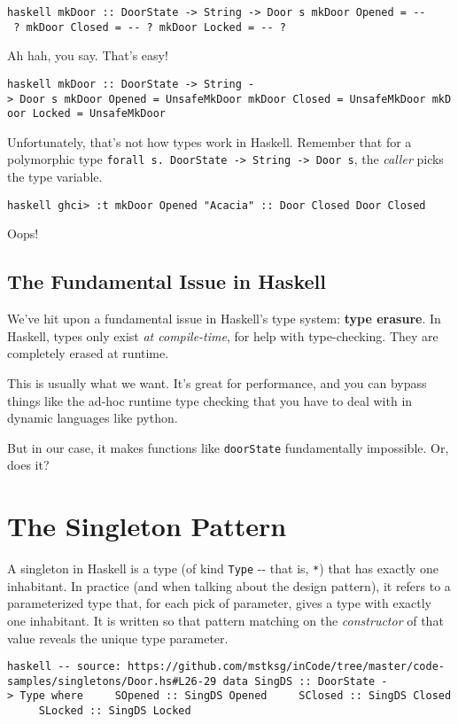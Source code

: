 \documentclass[]{article}
\begin{document}
\texttt{haskell\ mkDoor\ ::\ DoorState\ -\textgreater{}\ String\ -\textgreater{}\ Door\ s\ mkDoor\ Opened\ =\ -\/-\ ?\ mkDoor\ Closed\ =\ -\/-\ ?\ mkDoor\ Locked\ =\ -\/-\ ?}

Ah hah, you say. That's easy!

\texttt{haskell\ mkDoor\ ::\ DoorState\ -\textgreater{}\ String\ -\textgreater{}\ Door\ s\ mkDoor\ Opened\ =\ UnsafeMkDoor\ mkDoor\ Closed\ =\ UnsafeMkDoor\ mkDoor\ Locked\ =\ UnsafeMkDoor}

Unfortunately, that's not how types work in Haskell. Remember that for a
polymorphic type
\texttt{forall\ s.\ DoorState\ -\textgreater{}\ String\ -\textgreater{}\ Door\ s},
the \emph{caller} picks the type variable.

\texttt{haskell\ ghci\textgreater{}\ :t\ mkDoor\ Opened\ "Acacia"\ ::\ Door\ \textquotesingle{}Closed\ Door\ \textquotesingle{}Closed}

Oops!

\subsection{The Fundamental Issue in Haskell}

We've hit upon a fundamental issue in Haskell's type system: \textbf{type
erasure}. In Haskell, types only exist \emph{at compile-time}, for help with
type-checking. They are completely erased at runtime.

This is usually what we want. It's great for performance, and you can bypass
things like the ad-hoc runtime type checking that you have to deal with in
dynamic languages like python.

But in our case, it makes functions like \texttt{doorState} fundamentally
impossible. Or, does it?

\section{The Singleton Pattern}

A singleton in Haskell is a type (of kind \texttt{Type} -\/- that is,
\texttt{*}) that has exactly one inhabitant. In practice (and when talking about
the design pattern), it refers to a parameterized type that, for each pick of
parameter, gives a type with exactly one inhabitant. It is written so that
pattern matching on the \emph{constructor} of that value reveals the unique type
parameter.

\texttt{haskell\ -\/-\ source:\ https://github.com/mstksg/inCode/tree/master/code-samples/singletons/Door.hs\#L26-29\ data\ SingDS\ ::\ DoorState\ -\textgreater{}\ Type\ where\ \ \ \ \ SOpened\ ::\ SingDS\ \textquotesingle{}Opened\ \ \ \ \ SClosed\ ::\ SingDS\ \textquotesingle{}Closed\ \ \ \ \ SLocked\ ::\ SingDS\ \textquotesingle{}Locked}
\end{document}
